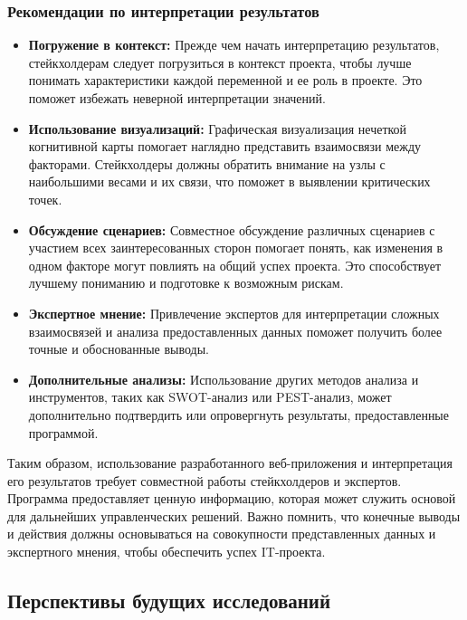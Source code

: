 \documentclass{article}
\begin{document}
    \subsubsection{Рекомендации по интерпретации результатов}

    \begin{itemize}
        \item \textbf{Погружение в контекст:}
        Прежде чем начать интерпретацию результатов, стейкхолдерам следует погрузиться в контекст проекта, чтобы лучше понимать характеристики каждой переменной и ее роль в проекте. Это поможет избежать неверной интерпретации значений.
        \item \textbf{Использование визуализаций:}
        Графическая визуализация нечеткой когнитивной карты помогает наглядно представить взаимосвязи между факторами. Стейкхолдеры должны обратить внимание на узлы с наибольшими весами и их связи, что поможет в выявлении критических точек.
        \item \textbf{Обсуждение сценариев:}
        Совместное обсуждение различных сценариев с участием всех заинтересованных сторон помогает понять, как изменения в одном факторе могут повлиять на общий успех проекта. Это способствует лучшему пониманию и подготовке к возможным рискам.
        \item \textbf{Экспертное мнение:}
        Привлечение экспертов для интерпретации сложных взаимосвязей и анализа предоставленных данных поможет получить более точные и обоснованные выводы.
        \item \textbf{Дополнительные анализы:}
        Использование других методов анализа и инструментов, таких как SWOT-анализ или PEST-анализ, может дополнительно подтвердить или опровергнуть результаты, предоставленные программой.
    \end{itemize}

    Таким образом, использование разработанного веб-приложения и интерпретация его результатов требует совместной работы стейкхолдеров и экспертов. Программа предоставляет ценную информацию, которая может служить основой для дальнейших управленческих решений. Важно помнить, что конечные выводы и действия должны основываться на совокупности представленных данных и экспертного мнения, чтобы обеспечить успех IT-проекта.

    \subsection{Перспективы будущих исследований}
\end{document}

